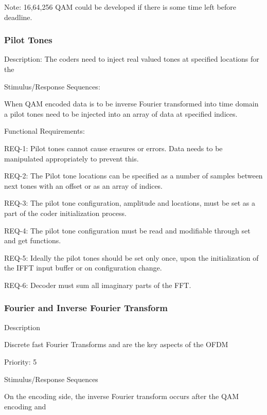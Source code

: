 \documentclass[]{report}
\begin{document}
Note: 16,64,256 QAM could be developed if there is some time left before deadline.

\subsubsection{Pilot Tones}

Description:
The coders need to inject real valued tones at specified locations for the \par

Stimulus/Response Sequences: \par
When QAM encoded data is to be inverse Fourier transformed into time domain a pilot tones need to be injected into an array of data at specified indices. \par

Functional Requirements: \par

REQ-1: Pilot tones cannot cause erasures or errors. Data needs to be manipulated appropriately to prevent this. \par
REQ-2: The Pilot tone locations can be specified as a number of samples between next tones with an offset or as an array of indices. \par
REQ-3: The pilot tone configuration, amplitude and locations, must be set as a part of the coder initialization process. \par
REQ-4: The pilot tone configuration must be read and modifiable through set and get functions. \par
REQ-5: Ideally the pilot tones should be set only once, upon the initialization of the IFFT input buffer or on configuration change. \par
REQ-6: Decoder must sum all imaginary parts of the FFT. \par


\subsubsection{Fourier and Inverse Fourier Transform}

Description \par
Discrete fast Fourier Transforms and are the key aspects of the OFDM \par

Priority: 5

Stimulus/Response Sequences \par
On the encoding side, the inverse Fourier transform occurs after the QAM encoding and  \par
\end{document}
